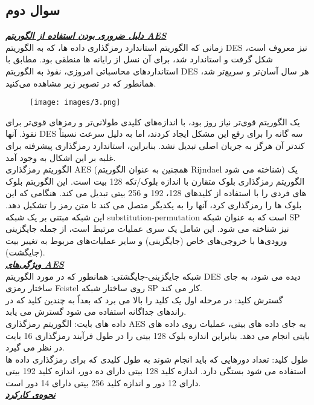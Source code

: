 \subsection{سوال دوم}
\textit{\textbf{\underline{دلیل ضروری بودن استفاده از الگوریتم AES}}}
\\
زمانی که الگوریتم استاندارد رمزگذاری داده ها، که به الگوریتم DES نیز معروف است، شکل گرفت و استاندارد شد، برای آن نسل از رایانه ها منطقی بود. مطابق با استانداردهای محاسباتی امروزی، نفوذ به الگوریتم DES هر سال آسان‌تر و سریع‌تر شد، همانطور که در تصویر زیر مشاهده می‌کنید.
\begin{figure}[H]
    \centering
    \texttt{[image: images/3.png]}
\end{figure}
یک الگوریتم قوی‌تر نیاز روز بود، با اندازه‌های کلیدی طولانی‌تر و رمزهای قوی‌تر برای نفوذ. آنها DES سه گانه را برای رفع این مشکل ایجاد کردند، اما به دلیل سرعت نسبتاً کندتر آن هرگز به جریان اصلی تبدیل نشد. بنابراین، استاندارد رمزگذاری پیشرفته برای غلبه بر این اشکال به وجود آمد.
\\
الگوریتم رمزگذاری AES (همچنین به عنوان الگوریتم Rijndael شناخته می شود) یک الگوریتم رمزگذاری بلوک متقارن با اندازه بلوک/تکه 128 بیت است. این الگوریتم بلوک های فردی را با استفاده از کلیدهای 128، 192 و 256 بیتی تبدیل می کند. هنگامی که این بلوک ها را رمزگذاری کرد، آنها را به یکدیگر متصل می کند تا متن رمز را تشکیل دهد.
این شبکه مبتنی بر یک شبکه substitution-permutation است که به عنوان شبکه SP نیز شناخته می شود. این شامل یک سری عملیات مرتبط است، از جمله جایگزینی ورودی‌ها با خروجی‌های خاص (جایگزینی) و سایر عملیات‌های مربوط به تغییر بیت (جایگشت).
\\
\textit{\textbf{\underline{ویژگی‌های AES}}}
\\
شبکه جایگزینی-جایگشتی: همانطور که در مورد الگوریتم DES دیده می شود، به جای ساختار رمزی Feistel روی ساختار شبکه SP کار می کند.
\\
گسترش کلید: در مرحله اول یک کلید را بالا می برد که بعداً به چندین کلید که در راندهای جداگانه استفاده می شود گسترش می یابد.
\\
داده های بایت: الگوریتم رمزگذاری AES به جای داده های بیتی، عملیات روی داده های بایتی انجام می دهد. بنابراین اندازه بلوک 128 بیتی را در طول فرآیند رمزگذاری 16 بایت در نظر می گیرد.
\\
طول کلید: تعداد دورهایی که باید انجام شوند به طول کلیدی که برای رمزگذاری داده ها استفاده می شود بستگی دارد. اندازه کلید 128 بیتی دارای ده دور، اندازه کلید 192 بیتی دارای 12 دور و اندازه کلید 256 بیتی دارای 14 دور است.
\\
\textit{\textbf{\underline{نحوه‌ی کارکرد}}}
